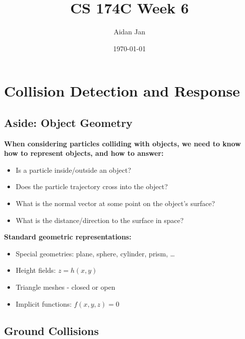\documentclass{article}
\title{CS 174C Week 6}
\author{Aidan Jan}
\date{\today}
\begin{document}
\maketitle
\section*{Collision Detection and Response}
\subsection*{Aside: Object Geometry}
\textbf{When considering particles colliding with objects, we need to know how to represent objects, and how to answer:}
\begin{itemize}
    \item Is a particle inside/outside an object?
    \item Does the particle trajectory cross into the object?
    \item What is the normal vector at some point on the object's surface?
    \item What is the distance/direction to the surface in space?
\end{itemize}
\textbf{Standard geometric representations:}
\begin{itemize}
    \item Special geometries: plane, sphere, cylinder, prism, \dots
    \item Height fields: $z = h(x, y)$
    \item Triangle meshes - closed or open
    \item Implicit functions: $f(x, y, z) = 0$
\end{itemize}
\subsection*{Ground Collisions}
\end{document}
